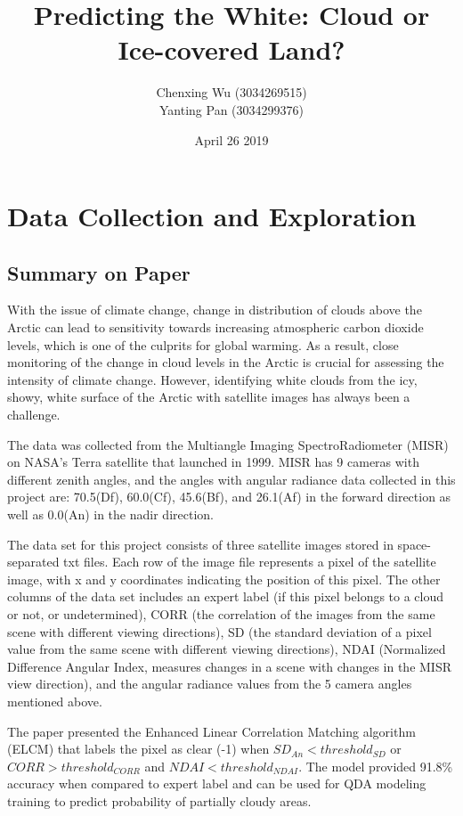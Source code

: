 \documentclass[11pt]{article}
\title{Predicting the White: Cloud or Ice-covered Land?}
\author{Chenxing Wu (3034269515) \\
Yanting Pan (3034299376)}
\date{April 26 2019}
\begin{document}
\maketitle

\section{Data Collection and Exploration}

\subsection{Summary on Paper}
With the issue of climate change, change in distribution of clouds above the Arctic can lead to sensitivity towards increasing atmospheric carbon dioxide levels, which is one of the culprits for global warming. As a result, close monitoring of the change in cloud levels in the Arctic is crucial for assessing the intensity of climate change. However, identifying white clouds from the icy, showy, white surface of the Arctic with satellite images has always been a challenge. 

The data was collected from the Multiangle Imaging SpectroRadiometer (MISR) on NASA's Terra satellite that launched in 1999. MISR has 9 cameras with different zenith angles, and the angles with angular radiance data collected in this project are: 70.5\degree (Df), 60.0\degree (Cf), 45.6\degree (Bf), and 26.1\degree (Af) in the forward direction as well as 0.0\degree (An) in the nadir direction. 

The data set for this project consists of three satellite images stored in space-separated txt files. Each row of the image file represents a pixel of the satellite image, with x and y coordinates indicating the position of this pixel. The other columns of the data set includes an expert label (if this pixel belongs to a cloud or not, or undetermined), CORR (the correlation of the images from the same scene with different viewing directions), SD (the standard deviation of a pixel value from the same scene with different viewing directions), NDAI (Normalized Difference Angular Index, measures changes in a scene with changes in the MISR view direction), and the angular radiance values from the 5 camera angles mentioned above.

The paper presented the Enhanced Linear Correlation Matching algorithm (ELCM) that labels the pixel as clear (-1) when $SD_{An} < threshold_{SD}$ or $CORR > threshold_{CORR}$ and $NDAI < threshold_{NDAI}$. The model provided 91.8\% accuracy when compared to expert label and can be used for QDA modeling training to predict probability of partially cloudy areas.
\end{document}
